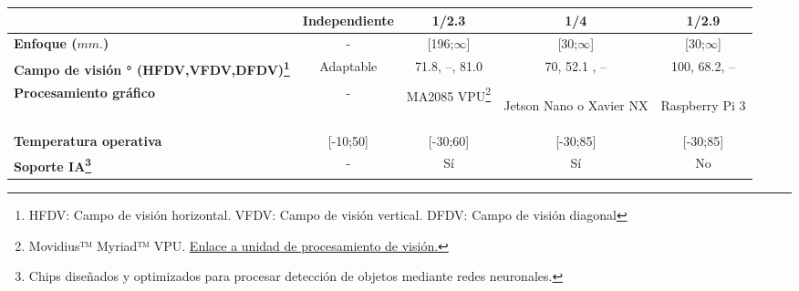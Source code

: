 \begin{itemize}
\begin{savenotes}
\begin{mytable}[H]
\begin{tabular}{l|c|c|c|c|}
{			} & Independiente & 1/2.3 & 1/4 & 1/2.9 \\ \hline
			\multicolumn{1}{|l|}{
				\begin{minipage}{\myforthmaxsizeofcontenttable}	
					\textbf{Enfoque ($mm.$)}
				\end{minipage}
			} & - & [196;$\infty$] & [30;$\infty$] & [30;$\infty$] \\ \hline
			\multicolumn{1}{|l|}{
				\begin{minipage}{\myforthmaxsizeofcontenttable}
					\textbf{Campo de visión ° (HFDV,VFDV,DFDV)\footnote{HFDV: Campo de visión horizontal. VFDV: Campo de visión vertical. DFDV: Campo de visión diagonal}}
				\end{minipage}
			} & Adaptable & 71.8, --, 81.0 & 70, 52.1 , -- & 100, 68.2, -- \\ \hline
			\multicolumn{1}{|l|}{
				\begin{minipage}{\myforthmaxsizeofcontenttable}	
					\textbf{Procesamiento gráfico}
				\end{minipage}
			} & - & MA2085 VPU\footnote{Movidius™ Myriad™ VPU. \href{https://www.intel.com/content/www/us/en/products/processors/movidius-vpu/movidius-myriad-x.html}{Enlace a unidad de procesamiento de visión.}} & 
			\begin{minipage}{\mythirdmaxsizeofcontenttable}\begin{myflushcenter}
				Jetson Nano o Xavier NX
			\end{myflushcenter}\end{minipage}
		 	& \begin{minipage}{\mythirdmaxsizeofcontenttable}\begin{myflushcenter}
		 			Raspberry Pi 3
		 	\end{myflushcenter}\end{minipage} \\ \hline 
		 	\multicolumn{1}{|l|}{
		 		\begin{minipage}{\myforthmaxsizeofcontenttable}	
		 			\textbf{Temperatura operativa}
		 		\end{minipage}
		 	} & [-10;50] & [-30;60] & [-30;85] & [-30;85] \\ \hline
			\multicolumn{1}{|l|}{
				\begin{minipage}{\myforthmaxsizeofcontenttable}	
					\textbf{Soporte IA\footnote{Chips diseñados y optimizados para procesar detección de objetos mediante redes neuronales.}}
				\end{minipage}
			} & - & Sí & Sí & No \\ \hline

\end{tabular}
\end{mytable}
\end{savenotes}
\end{itemize}
